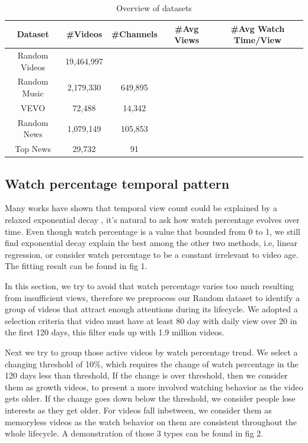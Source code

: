 \begin{table}
  \caption{Overview of datasets}
  \label{table:1}
  \begin{tabular}{ccccc}
    \toprule
    Dataset & \#Videos & \#Channels & \#Avg Views & \#Avg Watch Time/View \\
    \midrule
    Random Videos & 19,464,997 &  & \\ 
    Random Music & 2,179,330 & 649,895 & \\ 
    VEVO & 72,488 & 14,342 & \\
    Random News & 1,079,149 & 105,853 & \\
    Top News & 29,732 & 91 & \\
  \bottomrule
\end{tabular}
\end{table}

\subsection{Watch percentage temporal pattern}

Many works have shown that temporal view count could be explained by a relaxed exponential decay \cite{(R.Crane and D.Sornette, viral videos short paper)}, it's natural to ask how watch percentage evolves over time. Even though watch percentage is a value that bounded from 0 to 1, we still find exponential decay explain the best among the other two methods, i.e, linear regression, or consider watch percentage to be a constant irrelevant to video age. The fitting result can be found in fig 1.

In this section, we try to avoid that watch percentage varies too much resulting from insufficient views, therefore we preprocess our Random dataset to identify a group of videos that attract enough attentions during its lifecycle. We adopted a selection criteria that video must have at least 80 day with daily view over 20 in the first 120 days, this filter ends up with 1.9 million videos.

Next we try to group those active videos by watch percentage trend. We select a changing threshold of 10\%, which requires the change of watch percentage in the 120 days less than threshold, If the change is over threshold, then we consider them as growth videos, to present a more involved watching behavior as the video gets older. If the change goes down below the threshold, we consider people lose interests as they get older. For videos fall inbetween, we consider them as memoryless videos as the watch behavior on them are consistent throughout the whole lifecycle. A demonstration of those 3 types can be found in fig 2.

